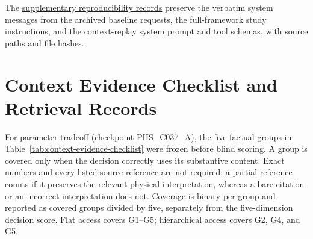 \documentclass[10pt]{article}
\begin{document}
The \href{https://github.com/wran021004-gif/softrobot-agent/tree/codex/gated-harness-paper-20261124/paper_handoff/supplementary_data/reproducibility}{supplementary reproducibility records} preserve the verbatim system messages from the archived baseline requests, the full-framework study instructions, and the context-replay system prompt and tool schemas, with source paths and file hashes.

\section{Context Evidence Checklist and Retrieval Records}
For parameter tradeoff (checkpoint PHS\_C037\_A), the five factual groups in Table~\ref{tab:context-evidence-checklist} were frozen before blind scoring. A group is covered only when the decision correctly uses its substantive content. Exact numbers and every listed source reference are not required; a partial reference counts if it preserves the relevant physical interpretation, whereas a bare citation or an incorrect interpretation does not. Coverage is binary per group and reported as covered groups divided by five, separately from the five-dimension decision score. Flat access covers G1--G5; hierarchical access covers G2, G4, and G5.
\end{document}
